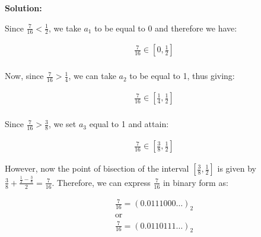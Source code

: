 \documentclass{article}
\newenvironment{solution}{
	\vspace{.5em}\par\large\textbf{{Solution:}}\par\vspace{.5em}
}{
	\vspace{.5em}
}
\begin{document}
\begin{solution}
	Since $\frac{7}{16} < \frac{1}{2}$, we take $a_1$ to be equal to 0 and therefore we have:

	\begin{gather*}
		\frac{7}{16} \in \left[ 0, \frac{1}{2} \right] \\
	\end{gather*}

	Now, since $\frac{7}{16} > \frac{1}{4}$, we can take $a_2$ to be equal to 1, thus giving:

	\begin{gather*}
		\frac{7}{16} \in \left[ \frac{1}{4}, \frac{1}{2} \right] \\
	\end{gather*}

	Since $\frac{7}{16} > \frac{3}{8}$, we set $a_3$ equal to 1 and attain:

	\begin{gather*}
		\frac{7}{16} \in \left[ \frac{3}{8}, \frac{1}{2} \right]
	\end{gather*}

	However, now the point of bisection of the interval $\left[ \frac{3}{8}, \frac{1}{2} \right]$ is given by $\frac{3}{8} + \frac{\frac{1}{2} - \frac{3}{8}}{2} = \frac{7}{16}$. Therefore, we can express $\frac{7}{16}$ in binary form as:

	\begin{gather*}
		\frac{7}{16} = \left( 0.0111000 \ldots \right)_2 \\
		\text{or} \\
		\frac{7}{16} = \left( 0.0110111 \ldots \right)_2 \\
	\end{gather*}

\end{solution}
\end{document}
